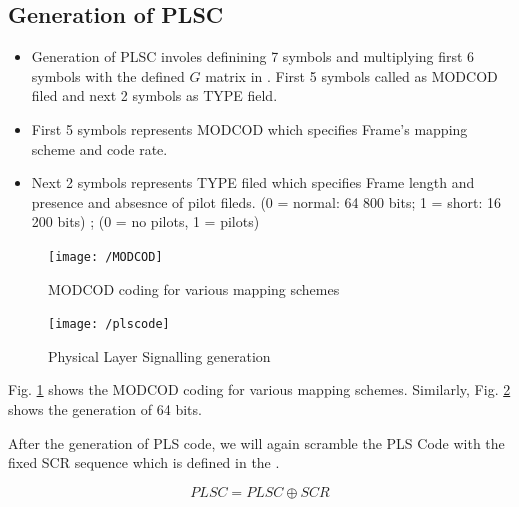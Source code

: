 \documentclass[journal,12pt,twocolumn]{IEEEtran}
\begin{document}
\subsection{Generation of PLSC}
\begin{itemize}
\item Generation of PLSC involes definining 7 symbols and multiplying first 6 symbols with the defined $G$ matrix in \cite{dvb}. First 5 symbols called as MODCOD filed and next 2 symbols as TYPE field.
\item First 5 symbols represents MODCOD which specifies Frame's mapping scheme and code rate.
\item Next 2 symbols represents TYPE filed which specifies Frame length and presence and absesnce of pilot fileds.
(0 = normal: 64 800 bits; 1 = short: 16 200 bits) ; (0 = no pilots, 1 = pilots)
\end{itemize}
%
\begin{figure}
\begin{center}
\texttt{[image: /MODCOD]}
\end{center}
\caption{MODCOD coding for various mapping schemes}
\label{fig:modcod}
\end{figure}
%
%
\begin{figure}
\begin{center}
\texttt{[image: /plscode]}
\end{center}
\caption{Physical Layer Signalling generation}
\label{fig:pls gen}
\end{figure}
%
 Fig. \ref{fig:modcod} shows the MODCOD coding for various mapping schemes. Similarly, Fig. \ref{fig:pls gen} shows the generation of 64 bits.
 
 After the generation of PLS code, we will again scramble the PLS Code with the fixed SCR sequence which is defined in the \cite{dvb}.
 
\begin{equation}
PLSC=PLSC \oplus SCR
\end{equation}
\end{document}
